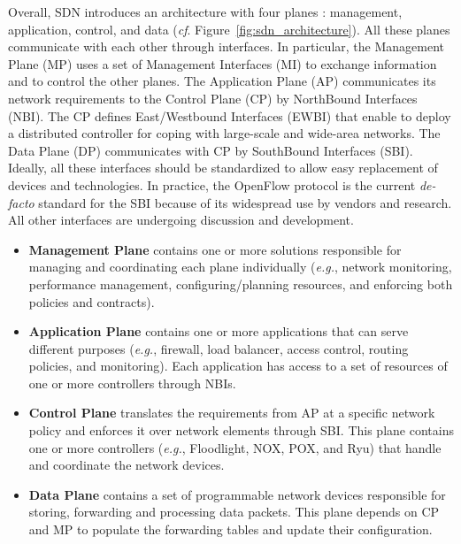 Overall, SDN introduces an architecture with four planes \cite{onf_2014:sdn_architecture_overview}: management, application, control, and data (\textit{cf}. Figure~\ref{fig:sdn_architecture}). All these planes communicate with each other through interfaces. In particular, the Management Plane (MP) uses a set of Management Interfaces (MI) to exchange information and to control the other planes. The Application Plane (AP) communicates its network requirements to the Control Plane (CP) by NorthBound Interfaces (NBI). The CP defines East/Westbound Interfaces (EWBI) that enable to deploy a distributed controller for coping with large-scale and wide-area networks. The Data Plane (DP) communicates with CP by SouthBound Interfaces (SBI). Ideally,  all these interfaces should be standardized to allow easy replacement of devices and technologies. In practice, the OpenFlow protocol is the current \textit{de-facto} standard for the SBI because of its widespread use by vendors and research. All other interfaces are undergoing discussion and development.

\begin{itemize}
    \item \textbf{Management Plane} contains one or more solutions responsible for managing and coordinating each plane individually (\textit{e.g.}, network monitoring, performance management, configuring/planning resources, and enforcing both policies and contracts).
    
    \item \textbf{Application Plane} contains one or more applications that can serve different purposes (\textit{e.g.}, firewall, load balancer, access control, routing policies, and monitoring). Each application has access to a set of resources of one or more controllers through NBIs.
    
    \item \textbf{Control Plane} translates the requirements from AP at a specific network policy and enforces it over network elements through SBI. This plane contains one or more controllers (\textit{e.g.}, Floodlight, NOX, POX, and Ryu) that handle and coordinate the network devices.
    
    \item \textbf{Data Plane} contains a set of programmable network devices responsible for storing, forwarding and processing data packets. This plane depends on CP and MP to populate the forwarding tables and update their configuration.
\end{itemize}

